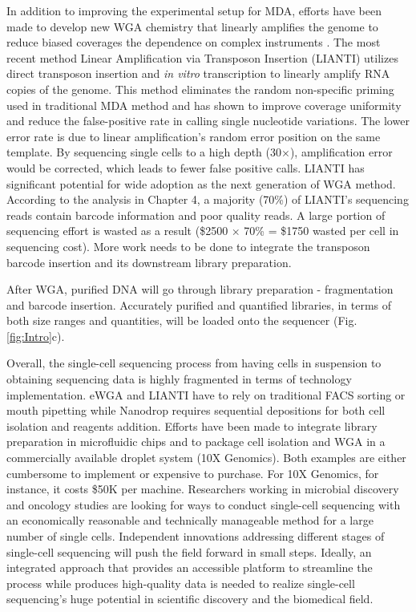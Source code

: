In addition to improving the experimental setup for MDA, efforts have been made to develop new WGA chemistry that linearly amplifies the genome to reduce biased coverages the dependence on complex instruments \cite{Zong:2012bs,Chen:2017hq}. The most recent method Linear Amplification via Transposon Insertion (LIANTI) utilizes direct transposon insertion and \textit{in vitro} transcription to linearly amplify RNA copies of the genome. This method eliminates the random non-specific priming used in traditional MDA method and has shown to improve coverage uniformity and reduce the false-positive rate in calling single nucleotide variations. The lower error rate is due to linear amplification's random error position on the same template. By sequencing single cells to a high depth (30$\times$), amplification error would be corrected, which leads to fewer false positive calls. LIANTI has significant potential for wide adoption as the next generation of WGA method. According to the analysis in Chapter 4, a majority (70\%) of LIANTI's sequencing reads contain barcode information and poor quality reads. A large portion of sequencing effort is wasted as a result (\$2500 $\times$ 70\% = \$1750 wasted per cell in sequencing cost). More work needs to be done to integrate the transposon barcode insertion and its downstream library preparation.

After WGA, purified DNA will go through library preparation - fragmentation and barcode insertion. Accurately purified and quantified libraries, in terms of both size ranges and quantities, will be loaded onto the sequencer (Fig. \ref{fig:Intro}c). 
 
Overall, the single-cell sequencing process from having cells in suspension to obtaining sequencing data is highly fragmented in terms of technology implementation. eWGA and LIANTI have to rely on traditional FACS sorting or mouth pipetting while Nanodrop requires sequential depositions for both cell isolation and reagents addition. Efforts have been made to integrate library preparation in microfluidic chips \cite{Kim:2017gy} and to package cell isolation and WGA in a commercially available droplet system (10X Genomics). Both examples are either cumbersome to implement or expensive to purchase. For 10X Genomics, for instance, it costs \$50K per machine. Researchers working in microbial discovery and oncology studies are looking for ways to conduct single-cell sequencing with an economically reasonable and technically manageable method for a large number of single cells. Independent innovations addressing different stages of single-cell sequencing will push the field forward in small steps. Ideally, an integrated approach that provides an accessible platform to streamline the process while produces high-quality data is needed to realize single-cell sequencing's huge potential in scientific discovery and the biomedical field. 

